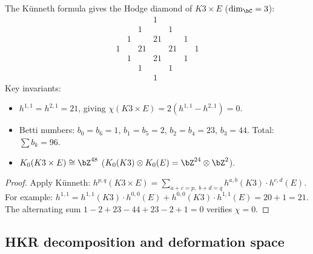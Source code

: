 \begin{proposition}
\label{prop:hodge-k3xe}
The K\"unneth formula gives the Hodge diamond of
$K3 \times E$ \textup{(}$\dim_\bC = 3$\textup{)}:
\[
\renewcommand{\arraystretch}{1.1}
\begin{array}{ccccccc}
& & & 1 & & & \\
& & 1 & & 1 & & \\
& 1 & & 21 & & 1 & \\
1 & & 21 & & 21 & & 1 \\
& 1 & & 21 & & 1 & \\
& & 1 & & 1 & & \\
& & & 1 & & &
\end{array}
\]
Key invariants:
\begin{itemize}
\item $h^{1,1} = h^{2,1} = 21$, giving
 $\chi(K3 \times E) = 2(h^{1,1} - h^{2,1}) = 0$.
\item Betti numbers: $b_0 = b_6 = 1$, $b_1 = b_5 = 2$,
 $b_2 = b_4 = 23$, $b_3 = 44$. Total: $\sum b_k = 96$.
\item $K_0(K3 \times E) \cong \bZ^{48}$
 \textup{(}$K_0(K3) \otimes K_0(E) = \bZ^{24} \otimes \bZ^2$\textup{)}.
\end{itemize}
\end{proposition}

\begin{proof}
Apply K\"unneth: $h^{p,q}(K3 \times E) = \sum_{a+c=p,\; b+d=q}
h^{a,b}(K3) \cdot h^{c,d}(E)$. For example:
$h^{1,1} = h^{1,1}(K3) \cdot h^{0,0}(E) + h^{0,0}(K3) \cdot
h^{1,1}(E) = 20 + 1 = 21$. The alternating sum
$1 - 2 + 23 - 44 + 23 - 2 + 1 = 0$ verifies $\chi = 0$.
\end{proof}

\subsection{HKR decomposition and deformation space}
\label{subsec:hkr-k3xe}

